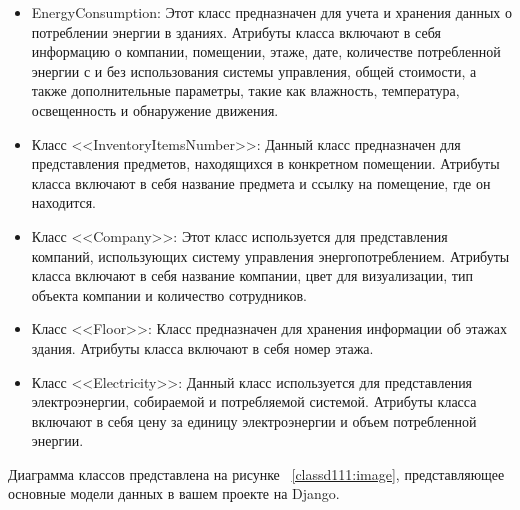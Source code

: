 \begin{itemize}
	
	\item {EnergyConsumption:} Этот класс предназначен для учета и хранения данных о потреблении энергии в зданиях. Атрибуты класса включают в себя информацию о компании, помещении, этаже, дате, количестве потребленной энергии с и без использования системы управления, общей стоимости, а также дополнительные параметры, такие как влажность, температура, освещенность и обнаружение движения.
	
	\item {Класс <<InventoryItemsNumber>>:} Данный класс предназначен для представления предметов, находящихся в конкретном помещении. Атрибуты класса включают в себя название предмета и ссылку на помещение, где он находится. 
	
	\item {Класс <<Company>>:} Этот класс используется для представления компаний, использующих систему управления энергопотреблением. Атрибуты класса включают в себя название компании, цвет для визуализации, тип объекта компании и количество сотрудников.
	
	\item {Класс <<Floor>>:} Класс предназначен для хранения информации об этажах здания. Атрибуты класса включают в себя номер этажа.
	
	\item {Класс <<Electricity>>:} Данный класс используется для представления электроэнергии, собираемой и потребляемой системой. Атрибуты класса включают в себя цену за единицу электроэнергии и объем потребленной энергии.

\end{itemize}

Диаграмма классов представлена на рисунке ~\ref{classd111:image}, представляющее основные модели данных в вашем проекте на Django.







